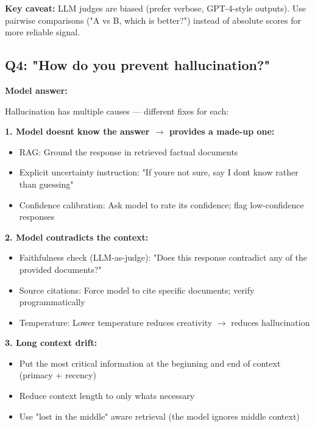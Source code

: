 \documentclass[11pt]{article}
\providecommand{\tightlist}{\setlength{\itemsep}{1pt}\setlength{\parskip}{0pt}}
\begin{document}
\textbf{Key caveat:} LLM judges are biased (prefer verbose, GPT-4-style outputs). Use pairwise comparisons ("A vs B, which is better?") instead of absolute scores for more reliable signal.

\subsection{Q4: "How do you prevent hallucination?"}\label{q4-how-do-you-prevent-hallucination}

\textbf{Model answer:}

Hallucination has multiple causes --- different fixes for each:

\textbf{1. Model doesn\textquotesingle t know the answer \(\rightarrow\) provides a made-up one:}

\begin{itemize}
\tightlist
\item
  RAG: Ground the response in retrieved factual documents
\item
  Explicit uncertainty instruction: "If you\textquotesingle re not sure, say \textquotesingle I don\textquotesingle t know\textquotesingle{} rather than guessing"
\item
  Confidence calibration: Ask model to rate its confidence; flag low-confidence responses
\end{itemize}

\textbf{2. Model contradicts the context:}

\begin{itemize}
\tightlist
\item
  Faithfulness check (LLM-as-judge): "Does this response contradict any of the provided documents?"
\item
  Source citations: Force model to cite specific documents; verify programmatically
\item
  Temperature: Lower temperature reduces creativity \(\rightarrow\) reduces hallucination
\end{itemize}

\textbf{3. Long context drift:}

\begin{itemize}
\tightlist
\item
  Put the most critical information at the beginning and end of context (primacy + recency)
\item
  Reduce context length to only what\textquotesingle s necessary
\item
  Use "lost in the middle" aware retrieval (the model ignores middle context)
\end{itemize}
\end{document}
